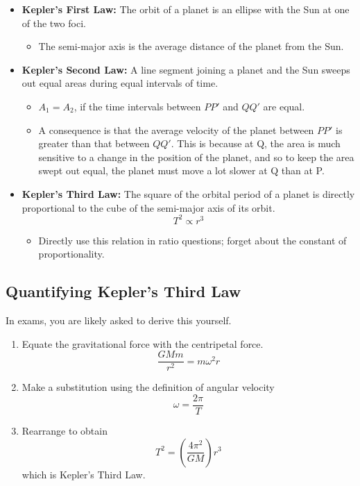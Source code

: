 \documentclass[a4paper,12pt]{article}
\newcommand{\paren}[1]{\left(#1\right)}
\begin{document}
\begin{itemize}
  \item \textbf{Kepler's First Law:} The orbit of a planet is an ellipse with the Sun at one of the two foci.
        \begin{itemize}
          \item The semi-major axis is the average distance of the planet from the Sun.
        \end{itemize}
  \item \textbf{Kepler's Second Law:} A line segment joining a planet and the Sun sweeps out equal areas during equal intervals of time.
        \begin{itemize}
          \item $A_1 = A_2$, if the time intervals between $PP'$ and $QQ'$ are equal.
          \item A consequence is that the average velocity of the planet between $PP'$ is greater than that between $QQ'$. This is because at Q, the area is much sensitive to a change in the position of the planet, and so to keep the area swept out equal, the planet must move a lot slower at Q than at P.
        \end{itemize}
  \item \textbf{Kepler's Third Law:} The square of the orbital period of a planet is directly proportional to the cube of the semi-major axis of its orbit. $$T^2 \propto r^3$$
        \begin{itemize}
          \item Directly use this relation in ratio questions; forget about the constant of proportionality.
        \end{itemize}
\end{itemize}

\subsection{Quantifying Kepler's Third Law}

In exams, you are likely asked to derive this yourself.
\begin{enumerate}
  \item Equate the gravitational force with the centripetal force.
        $$\frac{GMm}{r^2} = m\omega^2r$$
  \item Make a substitution using the definition of angular velocity
        $$\omega = \frac{2\pi}{T}$$

  \item Rearrange to obtain \begin{equation}\label{eq:kepler}
          T^2 = \paren{\frac{4\pi^2}{GM}}r^3\end{equation}
        which is Kepler's Third Law.
\end{enumerate}
\end{document}
